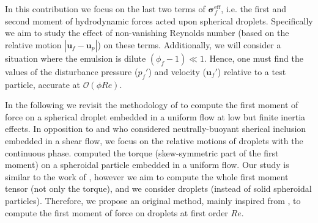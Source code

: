 In this contribution we focus on the last two terms of $\bm\sigma^\text{eff}_f$, i.e. the first and second moment of hydrodynamic forces acted upon spherical droplets.
Specifically we aim to study the effect of non-vanishing Reynolds number (based on the relative motion $|\textbf{u}_f - \textbf{u}_p|$) on these terms. 
Additionally, we will consider a situation where the emulsion is dilute $(\phi_f -1) \ll 1$. 
Hence, one must find the values of the disturbance pressure ($p_f'$) and velocity ($\textbf{u}_f'$) relative to a test particle, accurate at $\mathcal{O}(\phi Re)$. 






In the following we revisit the methodology of \citet{stone2001inertial,raja2010inertial,dabade2015}  to compute the first moment of force on a spherical droplet embedded in a uniform flow at low but finite inertia effects. 
In opposition to \citet{stone2001inertial} and \citet{raja2010inertial} who considered neutrally-buoyant sherical inclusion embedded in a shear flow, we focus on the relative motions of droplets with the continuous phase. 
\citet{dabade2015} computed the torque (skew-symmetric part of the first moment) on a spheroidal particle embedded in a uniform flow. 
Our study is similar to the work of \citet{dabade2015}, however we aim to compute the whole first moment tensor (not only the torque), and we consider droplets (instead of solid spheroidal particles). 
Therefore, we propose an original method, mainly inspired from \citet{stone2001inertial}, to compute the first moment of force on droplets at first order $Re$.  